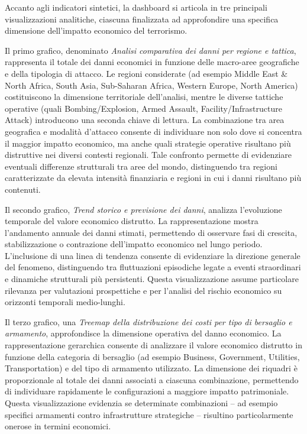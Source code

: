 Accanto agli indicatori sintetici, la dashboard si articola in tre principali visualizzazioni analitiche, ciascuna finalizzata ad approfondire una specifica dimensione dell’impatto economico del terrorismo.

Il primo grafico, denominato \textit{Analisi comparativa dei danni per regione e tattica}, rappresenta il totale dei danni economici in funzione delle macro-aree geografiche e della tipologia di attacco. Le regioni considerate (ad esempio Middle East \& North Africa, South Asia, Sub-Saharan Africa, Western Europe, North America) costituiscono la dimensione territoriale dell’analisi, mentre le diverse tattiche operative (quali Bombing/Explosion, Armed Assault, Facility/Infrastructure Attack) introducono una seconda chiave di lettura. La combinazione tra area geografica e modalità d’attacco consente di individuare non solo dove si concentra il maggior impatto economico, ma anche quali strategie operative risultano più distruttive nei diversi contesti regionali. Tale confronto permette di evidenziare eventuali differenze strutturali tra aree del mondo, distinguendo tra regioni caratterizzate da elevata intensità finanziaria e regioni in cui i danni risultano più contenuti.

Il secondo grafico, \textit{Trend storico e previsione dei danni}, analizza l’evoluzione temporale del valore economico distrutto. La rappresentazione mostra l’andamento annuale dei danni stimati, permettendo di osservare fasi di crescita, stabilizzazione o contrazione dell’impatto economico nel lungo periodo. L’inclusione di una linea di tendenza consente di evidenziare la direzione generale del fenomeno, distinguendo tra fluttuazioni episodiche legate a eventi straordinari e dinamiche strutturali più persistenti. Questa visualizzazione assume particolare rilevanza per valutazioni prospettiche e per l’analisi del rischio economico su orizzonti temporali medio-lunghi.

Il terzo grafico, una \textit{Treemap della distribuzione dei costi per tipo di bersaglio e armamento}, approfondisce la dimensione operativa del danno economico. La rappresentazione gerarchica consente di analizzare il valore economico distrutto in funzione della categoria di bersaglio (ad esempio Business, Government, Utilities, Transportation) e del tipo di armamento utilizzato. La dimensione dei riquadri è proporzionale al totale dei danni associati a ciascuna combinazione, permettendo di individuare rapidamente le configurazioni a maggiore impatto patrimoniale. Questa visualizzazione evidenzia se determinate combinazioni – ad esempio specifici armamenti contro infrastrutture strategiche – risultino particolarmente onerose in termini economici.

